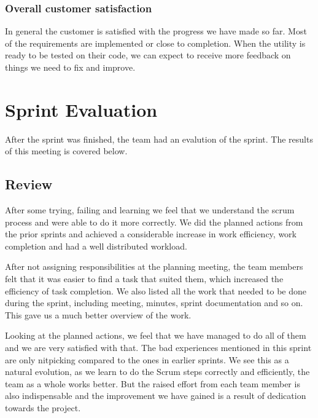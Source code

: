 \subsubsection{Overall customer satisfaction}
In general the customer is satisfied with the progress we have made so far. Most of the requirements are
implemented or close to completion. When the \gls{utility} is ready to be tested on their code, we can expect to receive more
feedback on things we need to fix and improve.

\section{Sprint Evaluation}
\label{sec:sp3:eval}
After the sprint was finished, the team had an evalution of the sprint. The 
results of this meeting is covered below.

\subsection{Review}
After some trying, failing and learning we feel that we understand the \Gls{scrum} process and were able to do it more correctly. We did the planned actions from the prior sprints and achieved a considerable increase in work efficiency, work completion and had a well distributed workload.

After not assigning responsibilities at the planning meeting, the team members felt that it was easier to find a task that suited them, which increased the efficiency of task completion. We also listed all the work that needed to be done during the sprint, including meeting, minutes, sprint documentation and so on. This gave us a much better overview of the work.

Looking at the planned actions, we feel that we have managed to do all of them and we are very satisfied with that. The bad experiences mentioned in this sprint are only nitpicking compared to the ones in earlier sprints. We see this as a natural evolution, as we learn to do the Scrum steps correctly and efficiently, the team as a whole works better.
But the raised effort from each team member is also indispensable and the improvement we have gained is a result of dedication towards the project.

